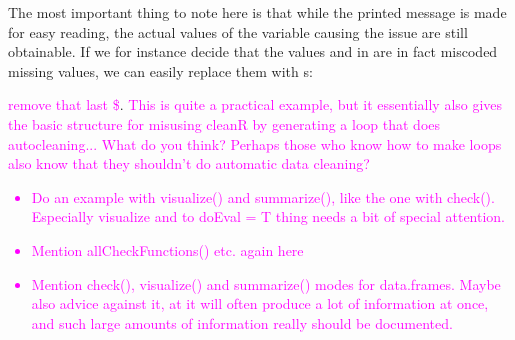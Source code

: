 \documentclass[article]{jss}
\newcommand{\hl}[1]{\textcolor{magenta}{#1}}
\newcommand{\R}[1]{\code{#1}}
\begin{document}
\begin{Schunk}
\end{Schunk}
The most important thing to note here is that while the printed message is made for easy reading, the actual values of the variable causing the issue are still obtainable. If we for instance decide that the values \R{999} and \R{NaN} in \R{var2} are in fact miscoded missing values, we can easily replace them with \R{NA}s:
\begin{Schunk}
\begin{Sinput}
> toyData$var2[toyData$var2 %in% missVar2$problemValues] <- NA
> identifyMissing(toyData$var2}
\end{Sinput}
\end{Schunk}
\hl{remove that last \$}. \hl{This is quite a practical example, but it essentially also gives the basic structure for misusing cleanR by generating a loop that does autocleaning... What do you think? Perhaps those who know how to make loops also know that they shouldn't do automatic data cleaning?}

\hl{
\begin{itemize}
\item Do an example with visualize() and summarize(), like the one with check(). Especially visualize and to doEval = T thing needs a bit of special attention.
\item  Mention allCheckFunctions() etc. again here
\item Mention check(), visualize() and summarize() modes for data.frames. Maybe also advice against it, at it will often produce a lot of information at once, and such large amounts of information really should be documented.
\end{itemize}
}
\end{document}
